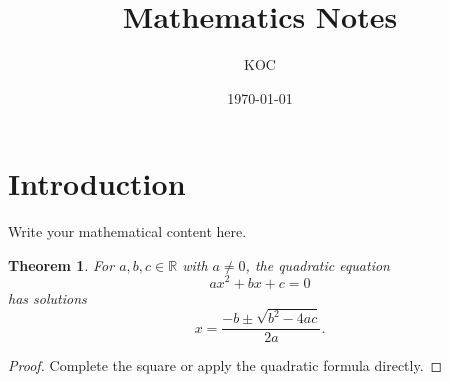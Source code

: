 \documentclass[12pt,a4paper]{article}
\title{Mathematics Notes}
\author{KOC}
\date{\today}
\newtheorem{theorem}{Theorem}[section]
\theoremstyle{definition}
\theoremstyle{remark}
\begin{document}
\maketitle

\section{Introduction}
Write your mathematical content here.

\begin{theorem}
For $a, b, c \in \mathbb{R}$ with $a \neq 0$, the quadratic equation
\[
  ax^2 + bx + c = 0
\]
has solutions
\[
  x = \frac{-b \pm \sqrt{b^2 - 4ac}}{2a}.
\]
\end{theorem}

\begin{proof}
Complete the square or apply the quadratic formula directly.
\end{proof}
\end{document}
